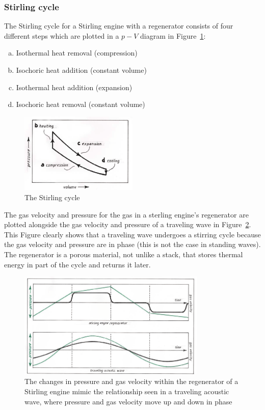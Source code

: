 \documentclass[a4paper]{article}
\begin{document}
\subsubsection{Stirling cycle}
The Stirling cycle for a Stirling engine with a regenerator consists of four different steps which are plotted in a \(p-V\) diagram in Figure~\ref{stirlingcycle}:
\begin{enumerate}[(a)]
  \item Isothermal heat removal (compression)
  \item Isochoric heat addition (constant volume)
  \item Isothermal heat addition (expansion)
  \item Isochoric heat removal (constant volume)
\end{enumerate}
\begin{figure}[ht]
  \centering
  \includegraphics[width=0.5\textwidth]{images/powerofsound/stirlingcycle.png}
  \caption{The Stirling cycle\cite{powerofsound}}\label{stirlingcycle}
\end{figure}
The gas velocity and pressure for the gas in a sterling engine's regenerator are plotted alongside the gas velocity and pressure of a traveling wave in Figure~\ref{pvstirling}. This Figure clearly shows that a traveling wave undergoes a stirring cycle because the gas velocity and pressure are in phase (this is not the case in standing waves). The regenerator is a porous material, not unlike a stack, that stores thermal energy in part of the cycle and returns it later.
\begin{figure}[ht]
  \centering
  \includegraphics[width=0.8\textwidth]{images/powerofsound/pvstirling.png}
  \caption{The changes in pressure and gas velocity within the regenerator of a Stirling engine mimic the relationship
    seen in a traveling acoustic wave, where pressure and gas velocity move up and down in phase\cite{powerofsound}}\label{pvstirling}
\end{figure}
\end{document}
